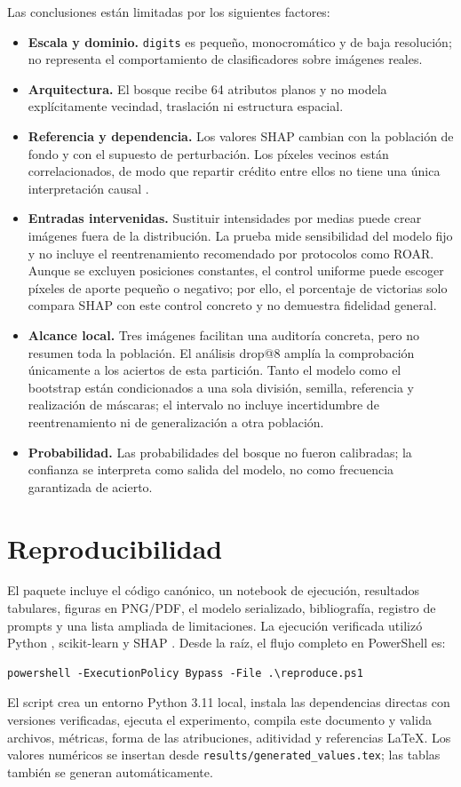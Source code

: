 \documentclass[11pt,letterpaper]{article}
\begin{document}
Las conclusiones están limitadas por los siguientes factores:
\begin{itemize}
  \item \textbf{Escala y dominio.} \texttt{digits} es pequeño, monocromático y de baja
  resolución; no representa el comportamiento de clasificadores sobre imágenes reales.
  \item \textbf{Arquitectura.} El bosque recibe 64 atributos planos y no modela
  explícitamente vecindad, traslación ni estructura espacial.
  \item \textbf{Referencia y dependencia.} Los valores SHAP cambian con la población de
  fondo y con el supuesto de perturbación. Los píxeles vecinos están correlacionados,
  de modo que repartir crédito entre ellos no tiene una única interpretación causal
  \citep{janzing2020feature}.
  \item \textbf{Entradas intervenidas.} Sustituir intensidades por medias puede crear
  imágenes fuera de la distribución. La prueba mide sensibilidad del modelo fijo y no
  incluye el reentrenamiento recomendado por protocolos como ROAR.
  Aunque se excluyen posiciones constantes, el control uniforme puede escoger píxeles
  de aporte pequeño o negativo; por ello, el
  porcentaje de victorias solo compara SHAP con este control concreto y no demuestra
  fidelidad general.
  \item \textbf{Alcance local.} Tres imágenes facilitan una auditoría concreta, pero no
  resumen toda la población. El análisis drop@8 amplía la comprobación únicamente a
  los aciertos de esta partición. Tanto el modelo como el bootstrap están condicionados
  a una sola división, semilla, referencia y realización de máscaras; el intervalo no
  incluye incertidumbre de reentrenamiento ni de generalización a otra población.
  \item \textbf{Probabilidad.} Las probabilidades del bosque no fueron calibradas; la confianza
  se interpreta como salida del modelo, no como frecuencia garantizada de acierto.
\end{itemize}

\section{Reproducibilidad}

El paquete incluye el código canónico, un notebook de ejecución, resultados tabulares,
figuras en PNG/PDF, el modelo serializado, bibliografía, registro de prompts y una lista
ampliada de limitaciones. La ejecución verificada utilizó Python \PythonVersion{},
scikit-learn \SklearnVersion{} y SHAP \ShapVersion{}. Desde la raíz, el flujo completo
en PowerShell es:
\begin{verbatim}
powershell -ExecutionPolicy Bypass -File .\reproduce.ps1
\end{verbatim}
El script crea un entorno Python 3.11 local, instala las dependencias directas con
versiones verificadas, ejecuta el
experimento, compila este documento y valida archivos, métricas, forma de las
atribuciones, aditividad y referencias LaTeX. Los valores numéricos se insertan desde
\texttt{results/generated\_values.tex}; las tablas también se generan automáticamente.
\end{document}
